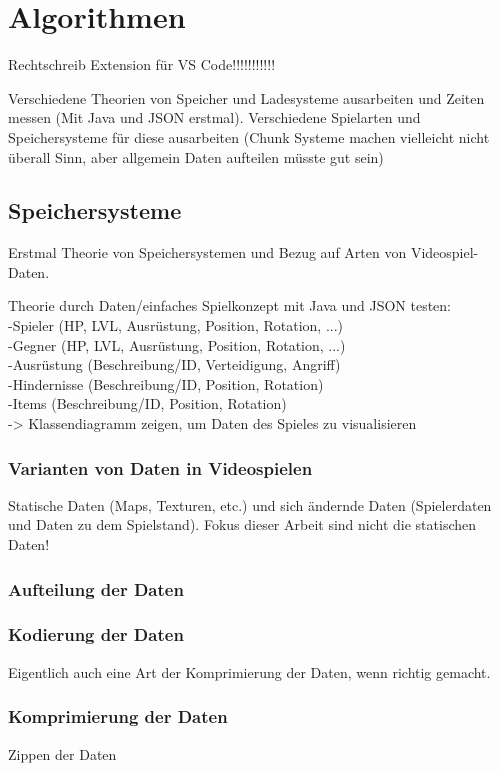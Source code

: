 \chapter{Algorithmen}\label{ch:algorithmen}
Rechtschreib Extension für VS Code!!!!!!!!!!!

Verschiedene Theorien von Speicher und Ladesysteme ausarbeiten und Zeiten 
messen (Mit Java und JSON erstmal). Verschiedene Spielarten und Speichersysteme
für diese ausarbeiten (Chunk Systeme machen vielleicht nicht überall Sinn, aber 
allgemein Daten aufteilen müsste gut sein)

\section{Speichersysteme}
Erstmal Theorie von Speichersystemen und Bezug auf Arten von Videospiel-Daten.

Theorie durch Daten/einfaches Spielkonzept mit Java und JSON testen:\\
-Spieler (HP, LVL, Ausrüstung, Position, Rotation, ...)\\
-Gegner (HP, LVL, Ausrüstung, Position, Rotation, ...)\\
-Ausrüstung (Beschreibung/ID, Verteidigung, Angriff)\\
-Hindernisse (Beschreibung/ID, Position, Rotation)\\
-Items (Beschreibung/ID, Position, Rotation)\\
-> Klassendiagramm zeigen, um Daten des Spieles zu visualisieren

\subsection{Varianten von Daten in Videospielen}
Statische Daten (Maps, Texturen, etc.) und sich ändernde Daten (Spielerdaten und 
Daten zu dem Spielstand). Fokus dieser Arbeit sind nicht die statischen Daten!

\subsection{Aufteilung der Daten}
\subsection{Kodierung der Daten}
Eigentlich auch eine Art der Komprimierung der Daten, wenn richtig gemacht. 

\subsection{Komprimierung der Daten}
Zippen der Daten

